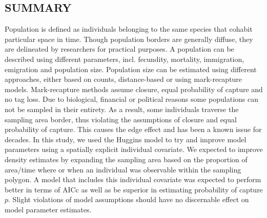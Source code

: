 \subsection{SUMMARY}
Population is defined as individuals belonging to the same species that cohabit particular space in time. Though population borders are generally diffuse, they are delineated by researchers for practical purposes. A population can be described using different parameters, incl. fecundity, mortality, immigration, emigration and population size. Population size can be estimated using different approaches, either based on counts, distance-based or using mark-recapture models. Mark-recapture methods assume closure, equal probability of capture and no tag loss. Due to biological, financial or political reasons some populations can not be sampled in their entirety. As a result, some individuals traverse the sampling area border, thus violating the assumptions of closure and equal probability of capture. This causes the edge effect and has been a known issue for decades. In this study, we used the Huggins model to try and improve model parameters using a spatially explicit individual covariate. We expected to improve density estimates by expanding the sampling area based on the proportion of area/time where or when an individual was observable within the sampling polygon. A model that includes this individual covariate was expected to perform better in terms of AICc as well as be superior in estimating probability of capture $p$. Slight violations of model assumptions should have no discernable effect on model parameter estimates.

